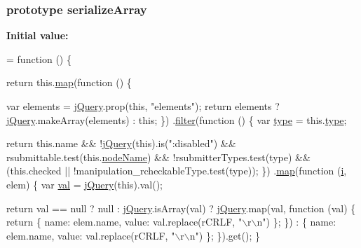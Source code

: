 \subsubsection[{\texorpdfstring{serialize\+Array}{serializeArray}}]{ {\bf prototype} serialize\+Array}\hypertarget{jquery-2_82_81-vsdoc_8js_a0ba7b24b29b3762704d7b7da11b98315}{}\label{jquery-2_82_81-vsdoc_8js_a0ba7b24b29b3762704d7b7da11b98315}
{\bfseries Initial value\+:}
\begin{DoxyCode}
= \textcolor{keyword}{function} () \{
        

        \textcolor{keywordflow}{return} this.\hyperlink{jquery-2_82_81-vsdoc_8js_a20838f8c4bedc779e51bf830f5a4d471}{map}(\textcolor{keyword}{function} () \{
            
            var elements = \hyperlink{jquery-2_82_81-vsdoc_8js_add5237586d970a38a81f990e8eb28c6c}{jQuery}.prop(\textcolor{keyword}{this}, \textcolor{stringliteral}{"elements"});
            \textcolor{keywordflow}{return} elements ? \hyperlink{jquery-2_82_81-vsdoc_8js_add5237586d970a38a81f990e8eb28c6c}{jQuery}.makeArray(elements) : \textcolor{keyword}{this};
        \})
        .\hyperlink{jquery-2_82_81-vsdoc_8js_ac99d0cf56cab46114f5765a14e03ad6d}{filter}(\textcolor{keyword}{function} () \{
            var \hyperlink{jquery-2_82_81-vsdoc_8js_a3940565e83a9bfd10d95ffd27536da91}{type} = this.\hyperlink{jquery-2_82_81-vsdoc_8js_a3940565e83a9bfd10d95ffd27536da91}{type};
            
            \textcolor{keywordflow}{return} this.name && !\hyperlink{jquery-2_82_81-vsdoc_8js_add5237586d970a38a81f990e8eb28c6c}{jQuery}(\textcolor{keyword}{this}).is(\textcolor{stringliteral}{":disabled"}) &&
                rsubmittable.test(this.\hyperlink{jquery-2_82_81-vsdoc_8js_a269e960a03eef49b8ed3a84932c1334d}{nodeName}) && !rsubmitterTypes.test(type) &&
                (this.checked || !manipulation\_rcheckableType.test(type));
        \})
        .\hyperlink{jquery-2_82_81-vsdoc_8js_a20838f8c4bedc779e51bf830f5a4d471}{map}(\textcolor{keyword}{function} (\hyperlink{geolocation-marker_8js_a0325b7ce0988782a8032e720ef3aa411}{i}, elem) \{
            var \hyperlink{jquery-2_82_81-vsdoc_8js_a0888cacd53defa08fbb4972d54ece4b0}{val} = \hyperlink{jquery-2_82_81-vsdoc_8js_add5237586d970a38a81f990e8eb28c6c}{jQuery}(\textcolor{keyword}{this}).val();

            \textcolor{keywordflow}{return} val == null ?
                null :
                \hyperlink{jquery-2_82_81-vsdoc_8js_add5237586d970a38a81f990e8eb28c6c}{jQuery}.isArray(val) ?
                    \hyperlink{jquery-2_82_81-vsdoc_8js_add5237586d970a38a81f990e8eb28c6c}{jQuery}.map(val, \textcolor{keyword}{function} (val) \{
                        \textcolor{keywordflow}{return} \{ name: elem.name, value: val.replace(rCRLF, \textcolor{stringliteral}{"\(\backslash\)r\(\backslash\)n"}) \};
                    \}) :
                    \{ name: elem.name, value: val.replace(rCRLF, \textcolor{stringliteral}{"\(\backslash\)r\(\backslash\)n"}) \};
        \}).\textcolor{keyword}{get}();
    \}
\end{DoxyCode}

